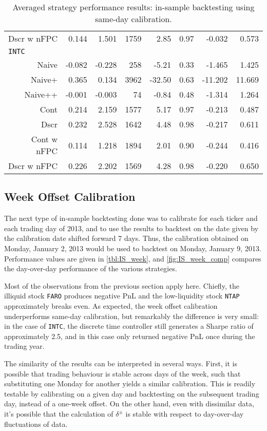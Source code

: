 \begin{table}
\begin{tabular}{@{} *{8}{r} @{}}
Dscr w nFPC & 0.144 & 1.501 & 1759 & 2.85 & 0.97 & -0.032 & 0.573 \\[2ex]
\multicolumn{8}{l}{\texttt{INTC}} \\
Naive & -0.082 & -0.228 & 258 & -5.21 & 0.33 & -1.465 & 1.425 \\ 
Naive+ & 0.365 & 0.134 & 3962 & -32.50 & 0.63 & -11.202 & 11.669 \\ 
Naive++ & -0.001 & -0.003 & 74 & -0.84 & 0.48 & -1.314 & 1.264 \\ 
Cont & 0.214 & 2.159 & 1577 & 5.17 & 0.97 & -0.213 & 0.487 \\ 
Dscr & 0.232 & 2.528 & 1642 & 4.48 & 0.98 & -0.217 & 0.611 \\ 
Cont w nFPC & 0.114 & 1.218 & 1894 & 2.01 & 0.90 & -0.244 & 0.416 \\ 
Dscr w nFPC &  0.226 & 2.202 & 1569 & 4.28 & 0.98 & -0.220 & 0.650 \\ 
\bottomrule
\end{tabular}
\caption{Averaged strategy performance results: in-sample backtesting using same-day calibration.}
\label{tbl:IS_sameday}
\end{table}


\FloatBarrier
\subsection{Week Offset Calibration}
The next type of in-sample backtesting done was to calibrate for each ticker and each trading day of 2013, and to use the results to backtest on the date given by the calibration date shifted forward 7 days. Thus, the calibration obtained on Monday, January 2, 2013 would be used to backtest on Monday, January 9, 2013. Performance values are given in \autoref{tbl:IS_week}, and \autoref{fig:IS_week_comp} compares the day-over-day performance of the various strategies. 

Most of the observations from the previous section apply here. Chiefly, the illiquid stock \texttt{FARO} produces negative PnL and the low-liquidity stock \texttt{NTAP} approximately breaks even. As expected, the week offset calibration underperforms same-day calibration, but remarkably the difference is very small: in the case of \texttt{INTC}, the discrete time controller still generates a Sharpe ratio of approximately 2.5, and in this case only returned negative PnL once during the trading year. 

The similarity of the results can be interpreted in several ways. First, it is possible that trading behaviour is stable across days of the week, such that substituting one Monday for another yields a similar calibration. This is readily testable by calibrating on a given day and backtesting on the subsequent trading day, instead of a one-week offset. On the other hand, even with dissimilar data, it's possible that the calculation of $\delta^\pm$ is stable with respect to day-over-day fluctuations of data.


